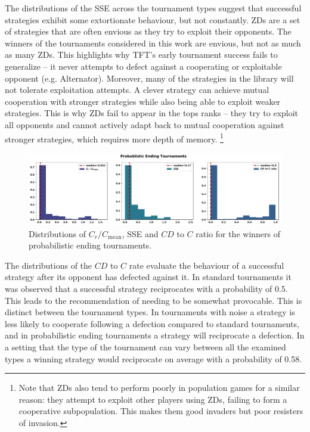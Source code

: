 \documentclass{article}
\begin{document}
The distributions of the SSE across the tournament types suggest that successful
strategies exhibit some extortionate behaviour, but not constantly.
ZDs are a set of strategies that are often envious as they try to exploit their
opponents. The winners of the tournaments considered in this work are
envious, but not as much as many ZDs. This highlights why TFT's early tournament
success fails to generalize -- it never attempts to defect against a cooperating
or exploitable opponent (e.g. Alternator). Moreover, many of the strategies in
the library will not tolerate exploitation attempts. A clever strategy can
achieve mutual cooperation with stronger strategies while also being able to
exploit weaker strategies. This is why ZDs fail to appear in the tops
ranks -- they try to exploit all opponents and cannot actively adapt back to
mutual cooperation against stronger strategies, which requires more depth of memory.
\footnote{Note that ZDs also tend to perform poorly in population games for
a similar reason: they attempt to exploit other players using ZDs, failing to
form a cooperative subpopulation. This makes them good invaders but poor resisters of invasion.}

\begin{figure}[!htbp]
    \centering
        \centering
        \includegraphics[width=\textwidth]{../images/probend_discussion.pdf}
        \caption{Distributions of \(C_r / C_{\text{mean}}\), SSE and \(CD\) to \(C\) ratio
        for the winners of probabilistic ending tournaments.}
        \label{fig:discussion_probend}
\end{figure}

The distributions of the \(CD\) to \(C\) rate evaluate the behaviour of a
successful strategy after its opponent has defected against it. In standard
tournaments it was observed that a successful strategy reciprocates with a
probability of 0.5.
This leads to the recommendation of needing to be somewhat provocable.
This is distinct between the tournament types. In
tournaments with noise a strategy is less likely to cooperate following a
defection compared to standard tournaments, and in probabilistic ending
tournaments a strategy will reciprocate a defection. In a setting that the type
of the tournament can vary between all the examined types a winning strategy
would reciprocate on average with a probability of 0.58.
\end{document}
